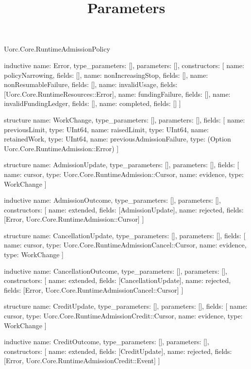 \begin{lexlean}{Uorc.Core.RuntimeAdmissionPolicy}
\title{Parameters}
\begin{semanticmodule}
inductive{
  name: Error,
  type_parameters: [],
  parameters: [],
  constructors: [
    {name: policyNarrowing, fields: []},
    {name: nonIncreasingStop, fields: []},
    {name: nonResumableFailure, fields: []},
    {name: invalidUsage, fields: [Uorc.Core.RuntimeResources::Error]},
    {name: fundingFailure, fields: []},
    {name: invalidFundingLedger, fields: []},
    {name: completed, fields: []}
  ]
}

structure{
  name: WorkChange,
  type_parameters: [],
  parameters: [],
  fields: [
    {name: previousLimit, type: UInt64},
    {name: raisedLimit, type: UInt64},
    {name: retainedWork, type: UInt64},
    {name: previousAdmissionFailure, type: (Option Uorc.Core.RuntimeAdmission::Error)}
  ]
}

structure{
  name: AdmissionUpdate,
  type_parameters: [],
  parameters: [],
  fields: [
    {name: cursor, type: Uorc.Core.RuntimeAdmission::Cursor},
    {name: evidence, type: WorkChange}
  ]
}

inductive{
  name: AdmissionOutcome,
  type_parameters: [],
  parameters: [],
  constructors: [
    {name: extended, fields: [AdmissionUpdate]},
    {name: rejected, fields: [Error, Uorc.Core.RuntimeAdmission::Cursor]}
  ]
}

structure{
  name: CancellationUpdate,
  type_parameters: [],
  parameters: [],
  fields: [
    {name: cursor, type: Uorc.Core.RuntimeAdmissionCancel::Cursor},
    {name: evidence, type: WorkChange}
  ]
}

inductive{
  name: CancellationOutcome,
  type_parameters: [],
  parameters: [],
  constructors: [
    {name: extended, fields: [CancellationUpdate]},
    {name: rejected, fields: [Error, Uorc.Core.RuntimeAdmissionCancel::Cursor]}
  ]
}

structure{
  name: CreditUpdate,
  type_parameters: [],
  parameters: [],
  fields: [
    {name: cursor, type: Uorc.Core.RuntimeAdmissionCredit::Cursor},
    {name: evidence, type: WorkChange}
  ]
}

inductive{
  name: CreditOutcome,
  type_parameters: [],
  parameters: [],
  constructors: [
    {name: extended, fields: [CreditUpdate]},
    {name: rejected, fields: [Error, Uorc.Core.RuntimeAdmissionCredit::Event]}
  ]
}


\end{semanticmodule}
\end{lexlean}
